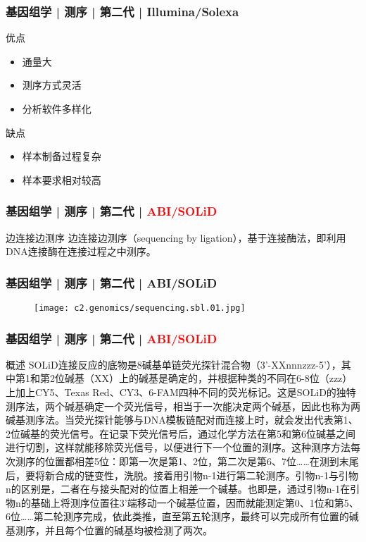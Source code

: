 \begin{frame}
  \frametitle{基因组学 | 测序 | 第二代 | Illumina/Solexa}
  \begin{block}{优点}
    \begin{itemize}
      \item 通量大
      \item 测序方式灵活
      \item 分析软件多样化
    \end{itemize}
  \end{block}
  \pause
  \begin{block}{缺点}
    \begin{itemize}
      \item 样本制备过程复杂
      \item 样本要求相对较高
    \end{itemize}
  \end{block}
\end{frame}

\begin{frame}
  \frametitle{基因组学 | 测序 | 第二代 | \textcolor{red}{ABI/SOLiD}}
  \begin{block}{边连接边测序}
边连接边测序（sequencing by ligation），基于连接酶法，即利用DNA连接酶在连接过程之中测序。  
  \end{block}
\end{frame}

\begin{frame}
  \frametitle{基因组学 | 测序 | 第二代 | ABI/SOLiD}
  \begin{figure}
    \centering
    \texttt{[image: c2.genomics/sequencing.sbl.01.jpg]}
  \end{figure}
\end{frame}

\begin{frame}
  \frametitle{基因组学 | 测序 | 第二代 | \textcolor{red}{ABI/SOLiD}}
  \begin{block}{概述}
SOLiD连接反应的底物是8碱基单链荧光探针混合物（3'-XXnnnzzz-5'），其中第1和第2位碱基（XX）上的碱基是确定的，并根据种类的不同在6-8位（zzz）上加上CY5、Texas Red、CY3、6-FAM四种不同的荧光标记。这是SOLiD的独特测序法，两个碱基确定一个荧光信号，相当于一次能决定两个碱基，因此也称为两碱基测序法。当荧光探针能够与DNA模板链配对而连接上时，就会发出代表第1、2位碱基的荧光信号。在记录下荧光信号后，通过化学方法在第5和第6位碱基之间进行切割，这样就能移除荧光信号，以便进行下一个位置的测序。这种测序方法每次测序的位置都相差5位：即第一次是第1、2位，第二次是第6、7位……在测到末尾后，要将新合成的链变性，洗脱。接着用引物n-1进行第二轮测序。引物n-1与引物n的区别是，二者在与接头配对的位置上相差一个碱基。也即是，通过引物n-1在引物n的基础上将测序位置往3'端移动一个碱基位置，因而就能测定第0、1位和第5、6位……第二轮测序完成，依此类推，直至第五轮测序，最终可以完成所有位置的碱基测序，并且每个位置的碱基均被检测了两次。
  \end{block}
\end{frame}

